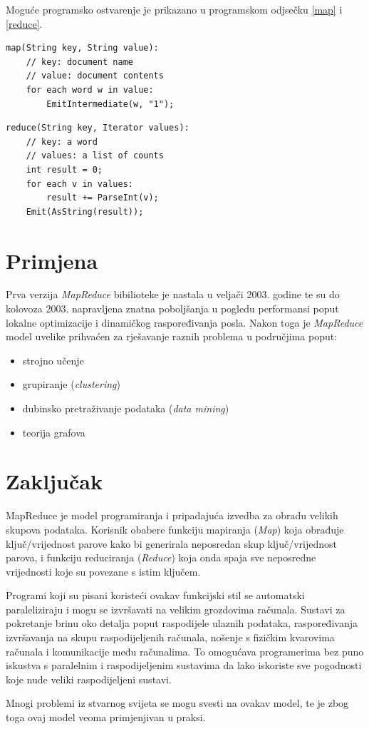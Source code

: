 \documentclass[11pt]{article}
\begin{document}
Moguće programsko ostvarenje je prikazano u programskom odjsečku \ref{map} i \ref{reduce}.
\begin{lstlisting}[caption=Funkcija Map, label=map]
map(String key, String value): 
	// key: document name 
	// value: document contents 
	for each word w in value: 
		EmitIntermediate(w, "1"); 
\end{lstlisting}

\begin{lstlisting}[caption=Funkcija Reduce, label=reduce]
reduce(String key, Iterator values): 
	// key: a word 
	// values: a list of counts 
	int result = 0; 
	for each v in values: 
		result += ParseInt(v); 
	Emit(AsString(result)); 
\end{lstlisting}

\section{Primjena}
Prva verzija \emph{MapReduce} bibilioteke je nastala u veljači 2003. godine te su do kolovoza 2003. napravljena znatna poboljšanja u pogledu performansi poput lokalne optimizacije i dinamičkog raspoređivanja posla. Nakon toga je \emph{MapReduce} model uvelike prihvaćen za rješavanje raznih problema  u područjima poput:
\begin{itemize}
\item strojno učenje
\item grupiranje (\emph{clustering})
\item dubinsko pretraživanje podataka (\emph{data mining})
\item teorija grafova
\end{itemize}

\section{Zaključak}
MapReduce je model programiranja i pripadajuća izvedba za obradu velikih skupova podataka. Korisnik obabere funkciju mapiranja (\emph{Map}) koja obrađuje ključ/vrijednost parove kako bi generirala neposredan skup ključ/vrijednost parova, i funkciju reduciranja (\emph{Reduce}) koja onda spaja sve neposredne vrijednosti koje su povezane s istim ključem. 

Programi koji su pisani koristeći ovakav funkcijski stil se automatski paraleliziraju i mogu se izvršavati na velikim grozdovima računala. Sustavi za pokretanje brinu oko detalja poput raspodijele ulaznih podataka, raspoređivanja izvršavanja na skupu raspodijeljenih računala, nošenje s fizičkim kvarovima računala i komunikacije među računalima. To omogućava programerima bez puno iskustva s paralelnim i raspodijeljenim sustavima da lako iskoriste sve pogodnosti koje nude veliki raspodijeljeni sustavi.

Mnogi problemi iz stvarnog svijeta se mogu svesti na ovakav model, te je zbog toga ovaj model veoma primjenjivan u praksi.
\end{document}
